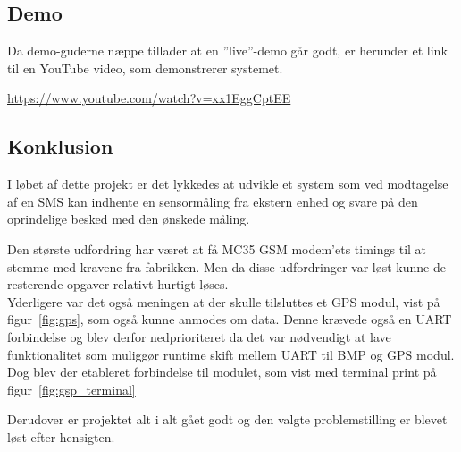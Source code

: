 \subsection{Demo}
Da demo-guderne næppe tillader at en ''live''-demo går godt, er herunder et link til en YouTube video, som demonstrerer systemet.

\vskip 0.5cm
	\begin{center}
		\url{https://www.youtube.com/watch?v=xx1EggCptEE}
	\end{center}
\vskip 0.5cm

\subsection{Konklusion}

I løbet af dette projekt er det lykkedes at udvikle et system som ved modtagelse af en SMS kan indhente en sensormåling fra ekstern enhed og svare på den oprindelige besked med den ønskede måling. 

Den største udfordring har været at få MC35 GSM modem'ets timings til at stemme med kravene fra fabrikken. Men da disse udfordringer var løst kunne de resterende opgaver relativt hurtigt løses.\\

Yderligere var det også meningen at der skulle tilsluttes et GPS modul, vist på figur~\ref{fig:gps}, som også kunne anmodes om data. Denne krævede også en UART forbindelse og blev derfor nedprioriteret da det var nødvendigt at lave funktionalitet som muliggør runtime skift mellem UART til BMP og GPS modul. Dog blev der etableret forbindelse til modulet, som vist med terminal print på figur~\ref{fig:gsp_terminal}

Derudover er projektet alt i alt gået godt og den valgte problemstilling er blevet løst efter hensigten. 
